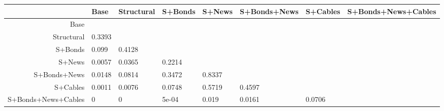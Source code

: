 \begin{table}[ht]
\centering
\begin{tabular}{rlllllll}
  \hline
 & Base & Structural & S+Bonds & S+News & S+Bonds+News & S+Cables & S+Bonds+News+Cables \\ 
  \hline
Base &  &  &  &  &  &  &  \\ 
  Structural & 0.3393 &  &  &  &  &  &  \\ 
  S+Bonds & 0.099 & 0.4128 &  &  &  &  &  \\ 
  S+News & 0.0057 & 0.0365 & 0.2214 &  &  &  &  \\ 
  S+Bonds+News & 0.0148 & 0.0814 & 0.3472 & 0.8337 &  &  &  \\ 
  S+Cables & 0.0011 & 0.0076 & 0.0748 & 0.5719 & 0.4597 &  &  \\ 
  S+Bonds+News+Cables & 0 & 0 & 5e-04 & 0.019 & 0.0161 & 0.0706 &  \\ 
   \hline
\end{tabular}
\end{table}
